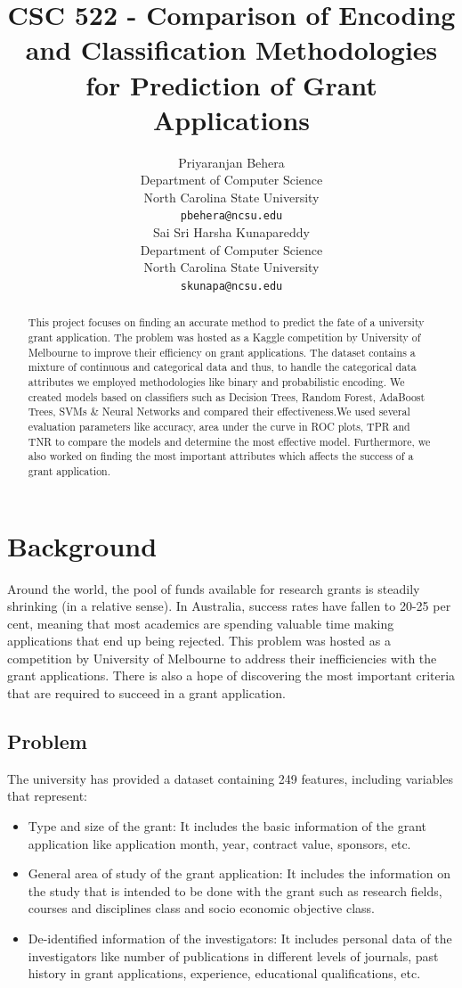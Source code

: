 \documentclass{article} %
\title{CSC 522 - Comparison of Encoding and Classification Methodologies for Prediction of Grant Applications}
\author{
	Priyaranjan Behera\\
	Department of Computer Science\\
	North Carolina State University\\
	\texttt{pbehera@ncsu.edu} \\
	\And
	Sai Sri Harsha Kunapareddy\\
	Department of Computer Science\\
	North Carolina State University\\
	\texttt{skunapa@ncsu.edu} \\
}
\begin{document}
	
	
	\maketitle
	
	\begin{abstract}
		This project focuses on finding an accurate method to predict the fate of a university grant application. The problem was hosted as a Kaggle competition by University of Melbourne to improve their efficiency on grant applications. The dataset contains a mixture of continuous and categorical data and thus, to handle the categorical data attributes we employed methodologies like binary and probabilistic encoding.  We created models based on classifiers such as  Decision Trees, Random Forest, AdaBoost Trees, SVMs \& Neural Networks and compared their effectiveness.We used several evaluation parameters like accuracy, area under the curve in ROC plots, TPR and TNR to compare the models and determine the most effective model. Furthermore, we also worked on finding the most important attributes which affects the success of a grant application.
	\end{abstract}
	
	\section{Background}
	
	Around the world, the pool of funds available for research grants is steadily shrinking (in a relative sense). In Australia, success rates have fallen to 20-25 per cent, meaning that most academics are spending valuable time making applications that end up being rejected. This problem was hosted as a competition by University of Melbourne to address their inefficiencies with the grant applications. There is also a hope of discovering the most important criteria that are required to succeed in a grant application. 
	
	\subsection{Problem}
	
	The university has provided a dataset containing 249 features, including variables that represent:
	
	\begin{itemize}
		\item Type and size of the grant: It includes the basic information of the grant application like application month, year, contract value, sponsors, etc.
		\item General area of study of the grant application: It includes the information on the study that is intended to be done with the grant such as research fields, courses and disciplines class and socio economic objective class.
		\item De-identified information of the investigators: It includes personal data of the investigators like number of publications in different levels of journals, past history in grant applications, experience, educational qualifications, etc.  
	\end{itemize}
	
\end{document}
